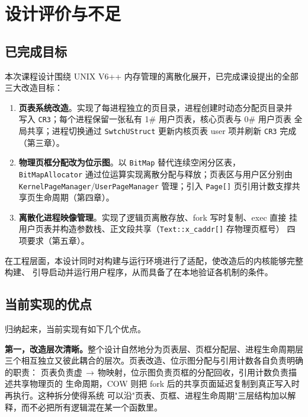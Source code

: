 \chapter{设计评价与不足}

\section{已完成目标}
本次课程设计围绕 UNIX V6++ 内存管理的离散化展开，已完成课设提出的全部三大改造目标：

\begin{enumerate}
  \item \textbf{页表系统改造}。实现了每进程独立的页目录，进程创建时动态分配页目录并
        写入 \texttt{CR3}；每个进程保留一张私有 1\# 用户页表，核心页表与 0\# 用户页表
        全局共享；进程切换通过 \texttt{SwtchUStruct} 更新内核页表 user 项并刷新
        \texttt{CR3} 完成（第三章）。
  \item \textbf{物理页框分配改为位示图}。以 \texttt{BitMap} 替代连续空闲分区表，
        \texttt{BitMapAllocator} 通过位运算实现离散分配与释放；页表区与用户区分别由
        \texttt{KernelPageManager}/\texttt{UserPageManager} 管理；引入 \texttt{Page[]}
        页引用计数支撑共享页生命周期（第四章）。
  \item \textbf{离散化进程映像管理}。实现了逻辑页离散存放、fork 写时复制、exec 直接
        挂用户页表并构造参数栈、正文段共享（\texttt{Text::x\_caddr[]} 存物理页框号）
        四项要求（第五章）。
\end{enumerate}

在工程层面，本设计同时对构建与运行环境进行了适配，使改造后的内核能够完整构建、
引导启动并运行用户程序，从而具备了在本地验证各机制的条件。

\section{当前实现的优点}
归纳起来，当前实现有如下几个优点。

\textbf{第一，改造层次清晰。}整个设计自然地分为页表层、页框分配层、进程生命周期层
三个相互独立又彼此耦合的层次。页表改造、位示图分配与引用计数各自负责明确的职责：
页表负责虚\,$\to$\,物映射，位示图负责页框的分配回收，引用计数负责描述共享物理页的
生命周期，COW 则把 fork 后的共享页面延迟复制到真正写入时再执行。这种拆分使得系统
可以沿"页表、页框、进程生命周期"三层结构加以解释，而不必把所有逻辑混在某一个函数里。


